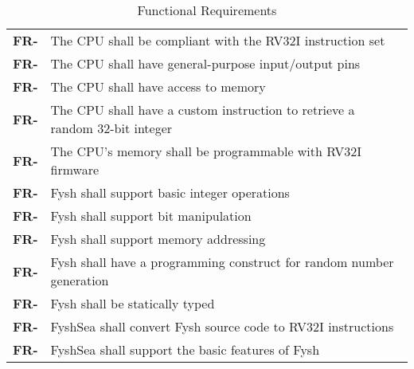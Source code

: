\resetfyshcounter
\newcommand{\fr}[1]{%
	\textbf{FR-\rc} & #1 \\%
	\hline%
}
\begin{table}[H]
	\begin{tabularx}{\textwidth}{| a | x |}
		\hline
		 &  \\
		\hline
		\fr{The CPU shall be compliant with the RV32I instruction set}
		\fr{The CPU shall have general-purpose input/output pins}
		\fr{The CPU shall have access to memory}
		\fr{The CPU shall have a custom instruction to retrieve a random 32-bit integer}
		\fr{The CPU's memory shall be programmable with RV32I firmware}
		\fr{Fysh shall support basic integer operations}
		\fr{Fysh shall support bit manipulation}
		\fr{Fysh shall support memory addressing}
		\fr{Fysh shall have a programming construct for random number generation}
		\fr{Fysh shall be statically typed}
		\fr{FyshSea shall convert Fysh source code to RV32I instructions}
		\fr{FyshSea shall support the basic features of Fysh}
	\end{tabularx}
	\caption{Functional Requirements}
\end{table}

